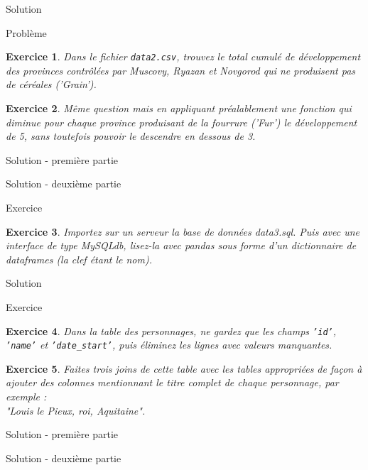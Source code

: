 \documentclass[11pt]{beamer}
\newtheorem{exercice}{Exercice}
\newcommand{\Python}[1]{
	{\small	}
}
\newcommand{\Pythonsmall}[1]{
	{\scriptsize }
}
\newcommand\Wider[2][3em]{%
\makebox[\linewidth][c]{%
  \begin{minipage}{\dimexpr\textwidth+#1\relax}
  \raggedright#2
  \end{minipage}%
  }%
}
\begin{document}
\begin{frame}{Solution}
\Python{ex102}
\end{frame}


\begin{frame}{Problème}
\begin{exercice}
Dans le fichier \texttt{data2.csv}, trouvez le total cumulé de développement des provinces contrôlées par Muscovy, Ryazan et Novgorod qui ne produisent pas de céréales ('Grain').
\end{exercice}
\begin{exercice}
Même question mais en appliquant préalablement une fonction qui diminue pour chaque province produisant de la fourrure ('Fur') le développement de 5, sans toutefois pouvoir le descendre en dessous de 3.
\end{exercice}
\end{frame}

\begin{frame}{Solution - première partie}
\Python{ex103}
\end{frame}

\begin{frame}{Solution - deuxième partie}
\Python{ex104}
\end{frame}

\begin{frame}{Exercice}
\begin{exercice}
Importez sur un serveur la base de données data3.sql. Puis avec une interface de type MySQLdb, lisez-la avec pandas sous forme d'un dictionnaire de dataframes (la clef étant le nom).
\end{exercice}
\end{frame}

\begin{frame}{Solution}
\Python{ex105}
\end{frame}

\begin{frame}{Exercice}
\begin{exercice}
Dans la table des personnages, ne gardez que les champs \texttt{'id'}, \texttt{'name'} et \texttt{'date\_start'}, puis éliminez les lignes avec valeurs manquantes.
\end{exercice}

\begin{exercice}
Faites trois joins de cette table avec les tables appropriées de façon à ajouter des colonnes mentionnant le titre complet de chaque personnage, par exemple :\\ 

\quad "Louis le Pieux, roi, Aquitaine".
\end{exercice}
\end{frame}

\begin{frame}{Solution - première partie}
\Python{ex106}
\end{frame}

\begin{frame}{Solution - deuxième partie}
\Wider{\Pythonsmall{ex107}}
\end{frame}
\end{document}

